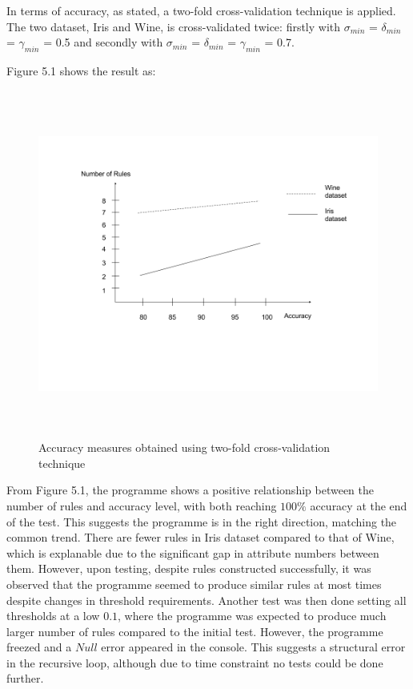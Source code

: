 In terms of accuracy, as stated, a two-fold cross-validation technique is applied. The two dataset, Iris and Wine, is cross-validated twice: firstly with $\sigma_{min}$ = $\delta_{min}$ = $\gamma_{min}$ = 0.5 and secondly with $\sigma_{min}$ = $\delta_{min}$ = $\gamma_{min}$ = 0.7.

Figure 5.1 shows the result as:

\begin{figure}[h]
    \centering
    \includegraphics[width=5.5in, height=4.5in]{figures/test1}
    \caption[Accuracy measures obtained using two-fold cross-validation technique]{Accuracy measures obtained using two-fold cross-validation technique}
    \label{fig:figure5_1}
\end{figure}

From Figure 5.1, the programme shows a positive relationship between the number of rules and accuracy level, with both reaching $100\%$ accuracy at the end of the test. This suggests the programme is in the right direction, matching the common trend. There are fewer rules in Iris dataset compared to that of Wine, which is explanable due to the significant gap in attribute numbers between them. 
However, upon testing, despite rules constructed successfully, it was observed that the programme seemed to produce similar rules at most times despite changes in threshold requirements. Another test was then done setting all thresholds at a low $0.1$, where the programme was expected to produce much larger number of rules compared to the initial test. However, the programme freezed and a $Null$ error appeared in the console. This suggests a structural error in the recursive loop, although due to time constraint no tests could be done further.






